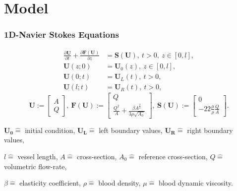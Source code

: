 \documentclass{beamer}
\begin{document}

\section{Model}

\begin{frame}
	\frametitle{1D-Navier Stokes Equations}
	\begin{equation}
		\begin{aligned}
			\frac{\partial \mathbf{U}}{\partial t} + \frac{\partial \mathbf{F} \left(
			\mathbf{U} \right)}{\partial z} &= \mathbf{S} \left( \mathbf{U} \right), \ t>0, \
			z \in \left[ 0,l \right], \\
			\mathbf{U} \left( z;0 \right) &= \mathbf{U}_0 \left( z \right), \ z \in \left[ 0,l \right], \\
			\mathbf{U} \left( 0;t \right) &= \mathbf{U}_L \left( t \right), \ t>0,\\
			\mathbf{U} \left( l;t \right) &= \mathbf{U}_R \left( t \right), \ t>0,
		\end{aligned} \label{eq:1deqs3}
	\end{equation}
	\begin{equation}
		\mathbf{U} :=
		\begin{bmatrix}
			A \\
			Q
		\end{bmatrix}, \ 
		\mathbf{F} \left( \mathbf{U} \right) :=
		\begin{bmatrix}
			Q \\
			\frac{Q^2}{A} + \frac{\beta A^{\frac{3}{2}}}{3\rho\sqrt{A_0}}
		\end{bmatrix}, \ 
		\mathbf{S} \left( \mathbf{U} \right) :=
		\begin{bmatrix}
			0 \\
			-22\frac{\mu}{\rho}\frac{Q}{A}
		\end{bmatrix}.
	\end{equation}

	\vfill

	{\tiny \centering 
		$\mathbf{U_0} \hat{=}$ initial condition, 
		$\mathbf{U_L} \hat{=}$ left boundary values,
		$\mathbf{U_R} \hat{=}$ right boundary values,

		$l \hat{=}$ vessel length,
		$A \hat{=}$ cross-section,
		$A_0 \hat{=}$ reference cross-section,
		$Q \hat{=}$ volumetric flow-rate,

		$\beta \hat{=}$ elasticity coefficient,
		$\rho \hat{=}$ blood density,
		$\mu \hat{=}$ blood dynamic viscosity. 
	\par}


\end{frame}
\end{document}
